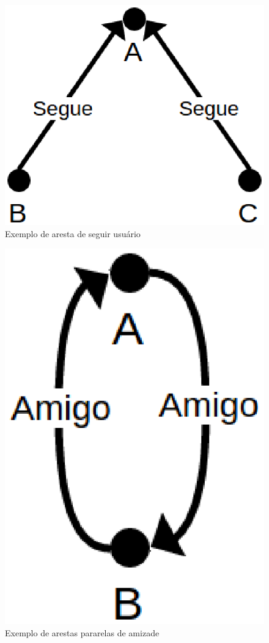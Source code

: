\begin{figure}[!h]
	\centering
	\includegraphics[scale=0.45]{figuras/capitulo5/segue.eps}
	\caption{Exemplo de aresta de seguir usuário}
	\label{segue}
\end{figure}

\begin{figure}[!h]
	\centering
	\includegraphics[scale=0.45]{figuras/capitulo5/amigo.eps}
	\caption{Exemplo de arestas pararelas de amizade}
	\label{amigo}
\end{figure}

